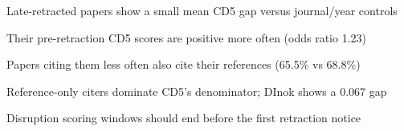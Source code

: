 \item Late-retracted papers show a small mean CD5 gap versus journal/year controls
\item Their pre-retraction CD5 scores are positive more often (odds ratio 1.23)
\item Papers citing them less often also cite their references (65.5\% vs 68.8\%)
\item Reference-only citers dominate CD5's denominator; DInok shows a 0.067 gap
\item Disruption scoring windows should end before the first retraction notice
